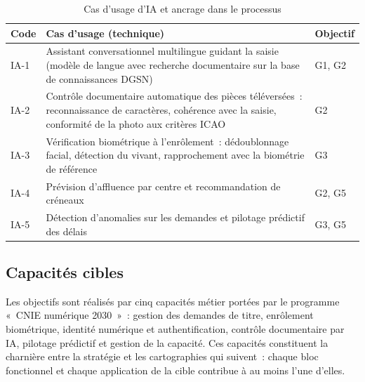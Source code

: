 \begin{table}[h]
\caption{Cas d'usage d'IA et ancrage dans le processus}
\label{tab:ia}
\centering
\small
\begin{tabularx}{\columnwidth}{lXl}
\toprule
\textbf{Code} & \textbf{Cas d'usage (technique)} & \textbf{Objectif} \\
\midrule
IA-1 & Assistant conversationnel multilingue guidant la saisie (modèle de langue avec recherche documentaire sur la base de connaissances DGSN) & G1, G2 \\
IA-2 & Contrôle documentaire automatique des pièces téléversées~: reconnaissance de caractères, cohérence avec la saisie, conformité de la photo aux critères ICAO \cite{icao9303} & G2 \\
IA-3 & Vérification biométrique à l'enrôlement~: dédoublonnage facial, détection du vivant, rapprochement avec la biométrie de référence & G3 \\
IA-4 & Prévision d'affluence par centre et recommandation de créneaux & G2, G5 \\
IA-5 & Détection d'anomalies sur les demandes et pilotage prédictif des délais & G3, G5 \\
\bottomrule
\end{tabularx}
\end{table}

\subsection{Capacités cibles}
Les objectifs sont réalisés par cinq capacités métier portées par le programme «~CNIE numérique 2030~»~: gestion des demandes de titre, enrôlement biométrique, identité numérique et authentification, contrôle documentaire par IA, pilotage prédictif et gestion de la capacité. Ces capacités constituent la charnière entre la stratégie et les cartographies qui suivent~: chaque bloc fonctionnel et chaque application de la cible contribue à au moins l'une d'elles.
